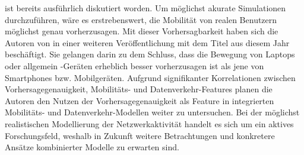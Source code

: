 \documentclass[12pt, a4paper]{article}
\begin{document}
ist bereits ausführlich diskutiert worden. Um möglichst akurate Simulationen durchzuführen, wäre es erstrebenswert,
die Mobilität von realen Benutzern möglichst genau vorherzusagen. Mit dieser Vorhersagbarkeit haben sich die Autoren
von \cite{Alipour2018} in einer weiteren Veröffentlichung mit dem Titel \cite{Alipour2019} aus diesem Jahr beschäftigt.
Sie gelangen darin zu dem Schluss, dass die Bewegung von Laptops oder allgemein -Geräten
erheblich besser vorherzusagen ist als jene von Smartphones bzw. Mobilgeräten.
Aufgrund signifikanter Korrelationen zwischen Vorhersagegenauigkeit, Mobilitäts- und Datenverkehr-Features
planen die Autoren den Nutzen der Vorhersagegenauigkeit als Feature in integrierten Mobilitäts- und Datenverkehr-Modellen
weiter zu untersuchen.\newline
Bei der möglichst realistischen Modellierung der Netzwerkaktivität handelt es sich um ein aktives Forschungsfeld,
weshalb in Zukunft weitere Betrachtungen und konkretere Ansätze kombinierter Modelle zu erwarten sind.

\vfill
\pagebreak


%


\vfill
\pagebreak
\end{document}
